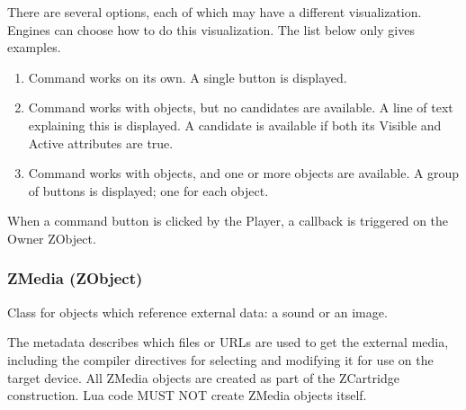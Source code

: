 \documentclass{article}
\begin{document}
There are several options, each of which may have a different visualization.
Engines can choose how to do this visualization. The list below only gives
examples.

\begin{enumerate}
	\item Command works on its own. A single button is displayed.
	\item Command works with objects, but no candidates are available. A line of text explaining this is displayed. A candidate is available if both its Visible and Active attributes are true.
	\item Command works with objects, and one or more objects are available. A group of buttons is displayed; one for each object.
\end{enumerate}

When a command button is clicked by the Player, a callback is triggered on the Owner ZObject.


\subsubsection{ZMedia (ZObject)}
Class for objects which reference external data: a sound or an image.

The metadata describes which files or URLs are used to get the external media,
including the compiler directives for selecting and modifying it for use on the
target device. All ZMedia objects are created as part of the ZCartridge
construction. Lua code MUST NOT create ZMedia objects itself.
\end{document}
